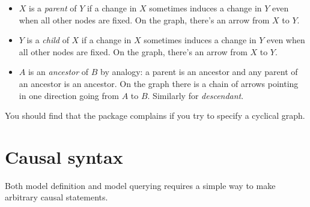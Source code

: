 \documentclass[
  12pt,
]{book}
\providecommand{\tightlist}{%
  \setlength{\itemsep}{0pt}\setlength{\parskip}{0pt}}
\begin{document}
\begin{itemize}
\tightlist
\item
  \(X\) is a \emph{parent} of \(Y\) if a change in \(X\) sometimes induces a change in \(Y\) even when all other nodes are fixed. On the graph, there's an arrow from \(X\) to \(Y\).
\item
  \(Y\) is a \emph{child} of \(X\) if a change in \(X\) sometimes induces a change in \(Y\) even when all other nodes are fixed. On the graph, there's an arrow from \(X\) to \(Y\).
\item
  \(A\) is an \emph{ancestor} of \(B\) by analogy: a parent is an ancestor and any parent of an ancestor is an ancestor. On the graph there is a chain of arrows pointing in one direction going from \(A\) to \(B\). Similarly for \emph{descendant}.
\end{itemize}

You should find that the package complains if you try to specify a cyclical graph.

\hypertarget{syntax}{%
\section{Causal syntax}\label{syntax}}

Both model definition and model querying requires a simple way to make arbitrary causal statements.
\end{document}

